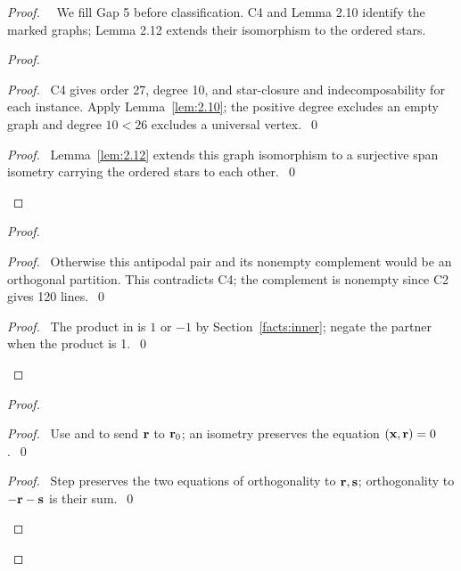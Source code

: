 \begin{proof}
 \pfsketch\ \repair\ We fill Gap 5 before classification. C4 and Lemma 2.10
 identify the marked graphs; Lemma 2.12 extends their isomorphism to the ordered stars.
 \begin{proof}
  \begin{proof}\pf\ C4 gives order 27, degree 10, and star-closure and
   indecomposability for each instance. Apply Lemma~\ref{lem:2.10}; the positive
   degree excludes an empty graph and degree $10<26$ excludes a universal vertex.~\qed\end{proof}
  \qedstep
  \begin{proof}\pf\ Lemma~\ref{lem:2.12} extends this graph isomorphism to a
   surjective span isometry carrying the ordered stars to each other.~\qed\end{proof}
 \end{proof}
 \begin{proof}
  \begin{proof}\pf\ Otherwise this antipodal pair and its nonempty complement
   would be an orthogonal partition. This contradicts C4; the complement is
   nonempty since C2 gives 120 lines.~\qed\end{proof}
  \qedstep
  \begin{proof}\pf\ The product in  is $1$ or $-1$
   by Section~\ref{facts:inner}; negate the partner when the product is 1.~\qed\end{proof}
 \end{proof}
 \begin{proof}
  \begin{proof}\pf\ Use  and  to send
   ${\mathbf r}$ to ${\mathbf r}_0$; an isometry preserves the equation $({\mathbf x},{\mathbf r})=0$.~\qed\end{proof}
  \begin{proof}\pf\ Step  preserves the two equations of
   orthogonality to ${\mathbf r},{\mathbf s}$; orthogonality to $-{\mathbf r}-{\mathbf s}$ is their sum.~\qed\end{proof}

\end{proof}
\end{proof}
